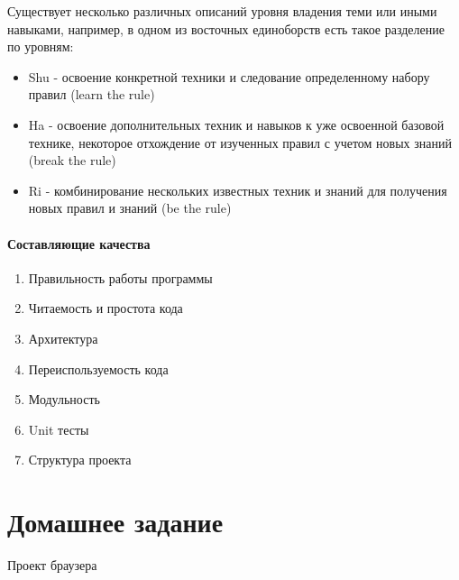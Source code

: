 Существует несколько различных описаний уровня владения теми или иными навыками, например, в одном из восточных единоборств есть такое разделение по уровням:

\begin{itemize}
\item Shu - освоение конкретной техники и следование определенному набору правил (learn the rule)

\item Ha - освоение дополнительных техник и навыков к уже освоенной базовой технике, некоторое отхождение от изученных правил с учетом новых знаний (break the
rule)

\item Ri - комбинирование нескольких известных техник и знаний для получения новых правил и знаний (be the rule)
\end{itemize}

\paragraph{Составляющие качества}

\begin{enumerate}
\item Правильность работы программы

\item Читаемость и простота кода

\item Архитектура

\item Переиспользуемость кода

\item Модульность

\item Unit тесты

\item Структура проекта
\end{enumerate}

\section{Домашнее задание}

Проект браузера